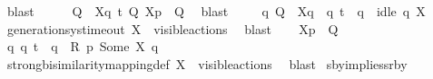 \begin{isabellebody}
\ blast\isanewline
\ \ \isamarkupfalse%
\ \isamarkupfalse%
\ Q{\isacharprime}{\kern0pt}\ \ {\isacartoucheopen}{\isasymtheta}{\isacharbrackleft}{\kern0pt}X{\isacharbrackright}{\kern0pt}{\isacharparenleft}{\kern0pt}q{\isacharparenright}{\kern0pt}\ {\isasymlongmapsto}\isactrlsup {\isasymtheta}t\ Q{\isacharprime}{\kern0pt}{\isacartoucheclose}\ {\isacartoucheopen}{\isasymtheta}{\isacharbrackleft}{\kern0pt}X{\isacharbrackright}{\kern0pt}{\isacharparenleft}{\kern0pt}p{\isacharprime}{\kern0pt}{\isacharparenright}{\kern0pt}\ {\isasymleftrightarrow}\ Q{\isacharprime}{\kern0pt}{\isacartoucheclose}\ \isamarkupfalse%
\ blast\isanewline
\ \ \isamarkupfalse%
\ {\isacartoucheopen}{\isasymexists}\ q{\isacharprime}{\kern0pt}{\isachardot}{\kern0pt}\ Q{\isacharprime}{\kern0pt}\ {\isacharequal}{\kern0pt}\ {\isasymtheta}{\isacharbrackleft}{\kern0pt}X{\isacharbrackright}{\kern0pt}{\isacharparenleft}{\kern0pt}q{\isacharprime}{\kern0pt}{\isacharparenright}{\kern0pt}\ {\isasymand}\ q\ {\isasymlongmapsto}t\ \ q{\isacharprime}{\kern0pt}\ {\isasymand}\ idle\ q\ X{\isacartoucheclose}\ \isamarkupfalse%
\ generation{\isacharunderscore}{\kern0pt}sys{\isacharunderscore}{\kern0pt}timeout\ {\isacartoucheopen}X\ {\isasymsubseteq}\ visible{\isacharunderscore}{\kern0pt}actions{\isacartoucheclose}\ \isamarkupfalse%
\ blast\isanewline
\ \ \isamarkupfalse%
\ {\isacartoucheopen}{\isasymtheta}{\isacharbrackleft}{\kern0pt}X{\isacharbrackright}{\kern0pt}{\isacharparenleft}{\kern0pt}p{\isacharprime}{\kern0pt}{\isacharparenright}{\kern0pt}\ {\isasymleftrightarrow}\ Q{\isacharprime}{\kern0pt}{\isacartoucheclose}\ \isamarkupfalse%
\ {\isacartoucheopen}{\isasymexists}q{\isacharprime}{\kern0pt}{\isachardot}{\kern0pt}\ q\ {\isasymlongmapsto}t\ \ q{\isacharprime}{\kern0pt}\ {\isasymand}\ {\isacharquery}{\kern0pt}R\ p{\isacharprime}{\kern0pt}\ {\isacharparenleft}{\kern0pt}Some\ X{\isacharparenright}{\kern0pt}\ q{\isacharprime}{\kern0pt}{\isacartoucheclose}\ \isanewline
\ \ \ \ \isamarkupfalse%
\ strong{\isacharunderscore}{\kern0pt}bisimilarity{\isacharunderscore}{\kern0pt}mapping{\isacharunderscore}{\kern0pt}def\ {\isacartoucheopen}X\ {\isasymsubseteq}\ visible{\isacharunderscore}{\kern0pt}actions{\isacartoucheclose}\ \isamarkupfalse%
\ blast\isanewline
{}\isamarkupfalse%
%
\endisatagproof
{\isafoldproof}%
%
\isadelimproof
\isanewline
%
\endisadelimproof
\isanewline
{}\isamarkupfalse%
\ sby{\isacharunderscore}{\kern0pt}implies{\isacharunderscore}{\kern0pt}srby{\isacharcolon}{\kern0pt}\isanewline

\end{isabellebody}
